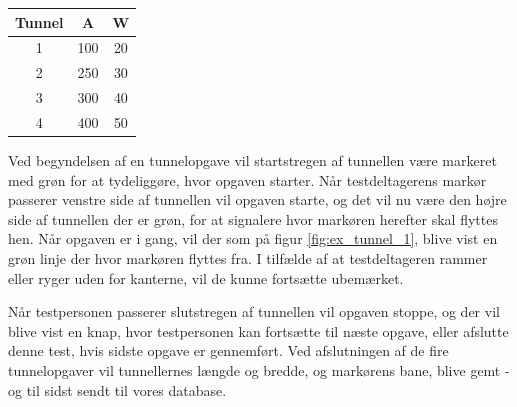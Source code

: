 \begin{center}
	\begin{tabular}{c c c}
		Tunnel & A & W \\
		\hline
		1 & 100 & 20 \\
		2 & 250 & 30 \\
		3 & 300 & 40 \\
		4 & 400 & 50 \\
	\end{tabular}
	\label{tab:tunnelopgave}
\end{center}
Ved begyndelsen af en tunnelopgave vil startstregen af tunnellen være markeret med grøn for at tydeliggøre, hvor opgaven starter. Når testdeltagerens markør passerer venstre side af tunnellen vil opgaven starte, og det vil nu være den højre side af tunnellen der er grøn, for at signalere hvor markøren herefter skal flyttes hen. Når opgaven er i gang, vil der som på figur \ref{fig:ex_tunnel_1}, blive vist en grøn linje der hvor markøren flyttes fra. I tilfælde af at testdeltageren rammer eller ryger uden for kanterne, vil de kunne fortsætte ubemærket.

Når testpersonen passerer slutstregen af tunnellen vil opgaven stoppe, og der vil blive vist en knap, hvor testpersonen kan fortsætte til næste opgave, eller afslutte denne test, hvis sidste opgave er gennemført. Ved afslutningen af de fire tunnelopgaver vil tunnellernes længde og bredde, og markørens bane, blive gemt - og til sidst sendt til vores database.

